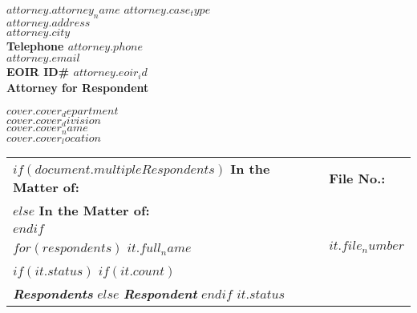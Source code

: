 \documentclass[12pt]{letter}
\date{}
\begin{document}
\begin{letter}{}
  \begin{flushleft}
    \textbf{$attorney.attorney_name$} \hfill \textbf{$attorney.case_type$} \\
    \textbf{$attorney.address$} \\
    \textbf{$attorney.city$} \\
    \textbf{Telephone $attorney.phone$} \\
    \textbf{$attorney.email$} \\
    \textbf{EOIR ID\# $attorney.eoir_id$} \\
    \textbf{Attorney for Respondent}
  \end{flushleft}
  
  \vspace{2em}
  
  \begin{center}
    \textbf{$cover.cover_department$} \\
    \textbf{$cover.cover_division$} \\
    \textbf{$cover.cover_name$} \\
    \textbf{$cover.cover_location$}
  \end{center}
  
  \vspace{2em}
   
\makebox[0.5\textwidth]{\hrulefill}
\begin{flushleft}
    \begin{tabular}{ p{} | p{} }


      $if(document.multipleRespondents)$
        \textbf{In the Matter of:} & \textbf{\hspace{1em}File No.:} \\
      $else$
        \textbf{In the Matter of:} \\
      $endif$ 

      \vspace{.0em} & \\ 

      $for(respondents)$
        \textbf{$it.full_name$} & \textbf{\hspace{1em}$it.file_number$} \\
        $if(it.status)$ 
          $if(it.count)$ 
            \vspace{.0em} & \\ 
            \textit{\textbf{Respondents}}
          $else$
            \textit{\textbf{Respondent}} 
          $endif$ 
          \textbf{$it.status$}


\end{tabular}
\end{flushleft}
\end{letter}
\end{document}

